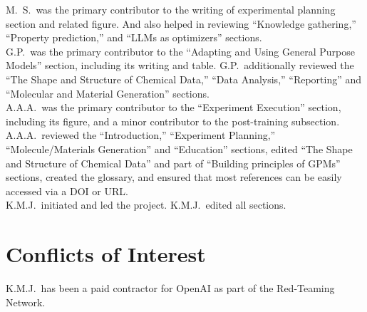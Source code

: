\documentclass[11pt, oneside]{article}
\begin{document}
\noindent M.\ S.\ was the primary contributor to the writing of experimental planning section and related figure. And also helped in reviewing \enquote{Knowledge gathering,} \enquote{Property prediction,} and \enquote{LLMs as optimizers} sections. \\


\noindent G.P.\ was the primary contributor to the \enquote{Adapting and Using General Purpose Models} section, including its writing and table. G.P.\ additionally reviewed the \enquote{The Shape and Structure of Chemical Data,} \enquote{Data Analysis,} \enquote{Reporting} and \enquote{Molecular and Material Generation} sections. \\

\noindent A.A.A.\ was the primary contributor to the \enquote{Experiment Execution} section, including its figure, and a minor contributor to the post-training subsection. A.A.A.\ reviewed the \enquote{Introduction,} \enquote{Experiment Planning,} \enquote{Molecule/Materials Generation} and \enquote{Education} sections, edited \enquote{The Shape and Structure of Chemical Data} and part of \enquote{Building principles of GPMs} sections, created the glossary, and ensured that most references can be easily accessed via a DOI or URL. \\

\noindent K.M.J.\ initiated and led the project. K.M.J.\ edited all sections. 

\section*{Conflicts of Interest}
K.M.J.\ has been a paid contractor for OpenAI as part of the Red-Teaming Network.

\clearpage
\printbibliography

\clearpage
\glsaddall
\printnoidxglossary[type=\acronymtype, sort=letter]
\printnoidxglossary[type=main, title=Glossary]
\end{document}
